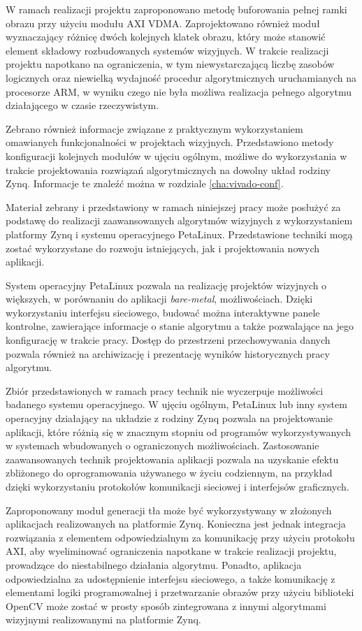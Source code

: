 W ramach realizacji projektu zaproponowano metodę buforowania pełnej ramki obrazu przy użyciu modułu AXI VDMA. 
Zaprojektowano również moduł wyznaczający różnicę dwóch kolejnych klatek obrazu, który może stanowić element składowy rozbudowanych systemów wizyjnych.
W trakcie realizacji projektu napotkano na ograniczenia, w tym niewystarczającą liczbę zasobów logicznych oraz niewielką wydajność procedur algorytmicznych uruchamianych na procesorze ARM, w wyniku czego nie była możliwa realizacja pełnego algorytmu działającego w czasie rzeczywistym.

Zebrano również informacje związane z praktycznym wykorzystaniem omawianych funkcjonalności w projektach wizyjnych. 
Przedstawiono metody konfiguracji kolejnych modułów w ujęciu ogólnym, możliwe do wykorzystania w trakcie projektowania rozwiązań algorytmicznych na dowolny układ rodziny Zynq. 
Informacje te znaleźć można w rozdziale \ref{cha:vivado-conf}.

Materiał zebrany i przedstawiony w ramach niniejszej pracy może posłużyć za podstawę do realizacji zaawansowanych algorytmów wizyjnych z wykorzystaniem platformy Zynq i systemu operacyjnego PetaLinux. 
Przedstawione techniki mogą zostać wykorzystane do rozwoju istniejących, jak i projektowania nowych aplikacji.

System operacyjny PetaLinux pozwala na realizację projektów wizyjnych o większych, w porównaniu do aplikacji \emph{bare-metal}, możliwościach. Dzięki wykorzystaniu interfejsu sieciowego, budować można interaktywne panele kontrolne, zawierające informacje o stanie algorytmu a także pozwalające na jego konfigurację w trakcie pracy. 
Dostęp do przestrzeni przechowywania danych pozwala również na archiwizację i prezentację wyników historycznych pracy algorytmu.

Zbiór przedstawionych w ramach pracy technik nie wyczerpuje możliwości badanego systemu operacyjnego. 
W ujęciu ogólnym, PetaLinux lub inny system operacyjny działający na układzie z rodziny Zynq pozwala na projektowanie aplikacji, które różnią się w znacznym stopniu od programów wykorzystywanych w systemach wbudowanych o ograniczonych możliwościach. 
Zastosowanie zaawansowanych technik projektowania aplikacji pozwala na uzyskanie efektu zbliżonego do oprogramowania używanego w życiu codziennym, na przykład dzięki wykorzystaniu protokołów komunikacji sieciowej i interfejsów graficznych.

Zaproponowany moduł generacji tła może być wykorzystywany w złożonych aplikacjach realizowanych na platformie Zynq. Konieczna jest jednak integracja rozwiązania z elementem odpowiedzialnym za komunikację przy użyciu protokołu AXI, aby wyeliminować ograniczenia napotkane w trakcie realizacji projektu, prowadzące do niestabilnego działania algorytmu. 
Ponadto, aplikacja odpowiedzialna za udostępnienie interfejsu sieciowego, a także komunikację z elementami logiki programowalnej i przetwarzanie obrazów przy użyciu biblioteki OpenCV może zostać w prosty sposób zintegrowana z innymi algorytmami wizyjnymi realizowanymi na platformie Zynq.
